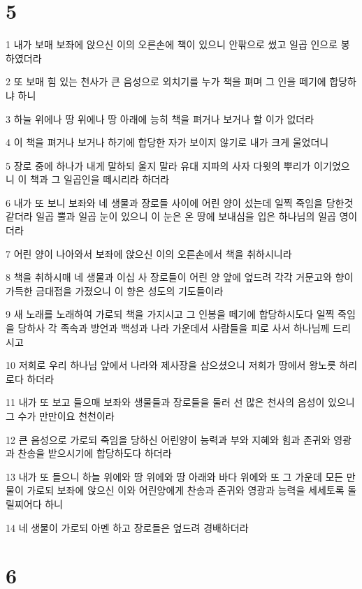 \chapter{5}

\par 1 내가 보매 보좌에 앉으신 이의 오른손에 책이 있으니 안팎으로 썼고 일곱 인으로 봉하였더라
\par 2 또 보매 힘 있는 천사가 큰 음성으로 외치기를 누가 책을 펴며 그 인을 떼기에 합당하냐 하니
\par 3 하늘 위에나 땅 위에나 땅 아래에 능히 책을 펴거나 보거나 할 이가 없더라
\par 4 이 책을 펴거나 보거나 하기에 합당한 자가 보이지 않기로 내가 크게 울었더니
\par 5 장로 중에 하나가 내게 말하되 울지 말라 유대 지파의 사자 다윗의 뿌리가 이기었으니 이 책과 그 일곱인을 떼시리라 하더라
\par 6 내가 또 보니 보좌와 네 생물과 장로들 사이에 어린 양이 섰는데 일찍 죽임을 당한것 같더라 일곱 뿔과 일곱 눈이 있으니 이 눈은 온 땅에 보내심을 입은 하나님의 일곱 영이더라
\par 7 어린 양이 나아와서 보좌에 앉으신 이의 오른손에서 책을 취하시니라
\par 8 책을 취하시매 네 생물과 이십 사 장로들이 어린 양 앞에 엎드려 각각 거문고와 향이 가득한 금대접을 가졌으니 이 향은 성도의 기도들이라
\par 9 새 노래를 노래하여 가로되 책을 가지시고 그 인봉을 떼기에 합당하시도다 일찍 죽임을 당하사 각 족속과 방언과 백성과 나라 가운데서 사람들을 피로 사서 하나님께 드리시고
\par 10 저희로 우리 하나님 앞에서 나라와 제사장을 삼으셨으니 저희가 땅에서 왕노릇 하리로다 하더라
\par 11 내가 또 보고 들으매 보좌와 생물들과 장로들을 둘러 선 많은 천사의 음성이 있으니 그 수가 만만이요 천천이라
\par 12 큰 음성으로 가로되 죽임을 당하신 어린양이 능력과 부와 지혜와 힘과 존귀와 영광과 찬송을 받으시기에 합당하도다 하더라
\par 13 내가 또 들으니 하늘 위에와 땅 위에와 땅 아래와 바다 위에와 또 그 가운데 모든 만물이 가로되 보좌에 앉으신 이와 어린양에게 찬송과 존귀와 영광과 능력을 세세토록 돌릴찌어다 하니
\par 14 네 생물이 가로되 아멘 하고 장로들은 엎드려 경배하더라

\chapter{6}

